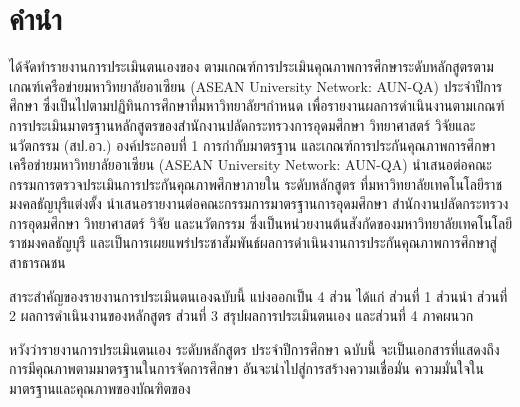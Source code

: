 \pagestyle{empty}
\chapter*{คำนำ}

\printdepartment{} \printfaculty{} \printuniversity{} ได้จัดทำรายงานการประเมินตนเองของ\printprogram{} ตามเกณฑ์การประเมินคุณภาพการศึกษาระดับหลักสูตรตามเกณฑ์เครือข่ายมหาวิทยาลัยอาเซียน (ASEAN University Network: AUN-QA) ประจำปีการศึกษา \printyear{} ซึ่งเป็นไปตามปฏิทินการศึกษาที่มหาวิทยาลัยฯกำหนด เพื่อรายงานผลการดำเนินงานตามเกณฑ์การประเมินมาตรฐานหลักสูตรของสำนักงานปลัดกระทรวงการอุดมศึกษา วิทยาศาสตร์ วิจัยและนวัตกรรม (สป.อว.) 
องค์ประกอบที่ 1 การกำกับมาตรฐาน และเกณฑ์การประกันคุณภาพการศึกษาเครือข่ายมหาวิทยาลัยอาเซียน (ASEAN University Network: AUN-QA)  นำเสนอต่อคณะกรรมการตรวจประเมินการประกันคุณภาพศึกษาภายใน ระดับหลักสูตร ที่มหาวิทยาลัยเทคโนโลยีราชมงคลธัญบุรีแต่งตั้ง นำเสนอรายงานต่อคณะกรรมการมาตรฐานการอุดมศึกษา สำนักงานปลัดกระทรวงการอุดมศึกษา วิทยาศาสตร์ วิจัย และนวัตกรรม ซึ่งเป็นหน่วยงานต้นสังกัดของมหาวิทยาลัยเทคโนโลยีราชมงคลธัญบุรี และเป็นการเผยแพร่ประชาสัมพันธ์ผลการดำเนินงานการประกันคุณภาพการศึกษาสู่สาธารณชน

สาระสำคัญของรายงานการประเมินตนเองฉบับนี้ แบ่งออกเป็น 4 ส่วน ได้แก่ ส่วนที่ 1 ส่วนนำ ส่วนที่ 2 ผลการดำเนินงานของหลักสูตร ส่วนที่ 3 สรุปผลการประเมินตนเอง และส่วนที่ 4 ภาคผนวก
	
\printdepartment{} หวังว่ารายงานการประเมินตนเอง ระดับหลักสูตร ประจำปีการศึกษา \printyear{} ฉบับนี้ จะเป็นเอกสารที่แสดงถึงการมีคุณภาพตามมาตรฐานในการจัดการศึกษา อันจะนำไปสู่การสร้างความเชื่อมั่น ความมั่นใจในมาตรฐานและคุณภาพของบัณฑิตของ\printuniversity{}

\begin{flushright}
\printdepartment\\
\printfaculty
\end{flushright}

